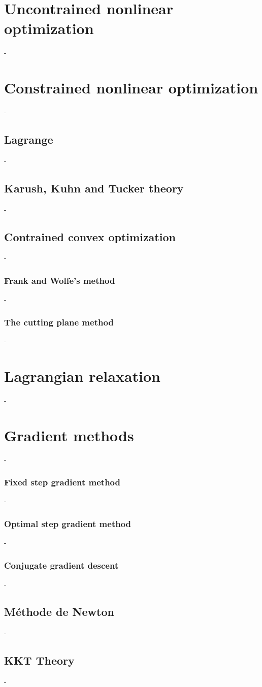 \documentclass[12pt,openany,oneside]{book}
\theoremstyle{definition}
\numberwithin{definition}{section}
\numberwithin{theorem}{section}
\numberwithin{corollary}{section}
\numberwithin{proposition}{section}
\numberwithin{notation}{section}
\numberwithin{remark}{section}
\numberwithin{hypothesis}{section}
\numberwithin{example}{section}
\begin{document}
\section{Uncontrained nonlinear optimization}-
\section{Constrained nonlinear optimization}-
\subsection{Lagrange}-
\subsection{Karush, Kuhn and Tucker theory}-
\subsection{Contrained convex optimization}-
\subsubsection{Frank and Wolfe's method}-
\subsubsection{The cutting plane method}-
\section{Lagrangian relaxation}-
\section{Gradient methods}-
\subsubsection{Fixed step gradient method}-
\subsubsection{Optimal step gradient method}-
\subsubsection{Conjugate gradient descent}-
\subsection{Méthode de Newton}-
\subsection{KKT Theory}-
\end{document}
